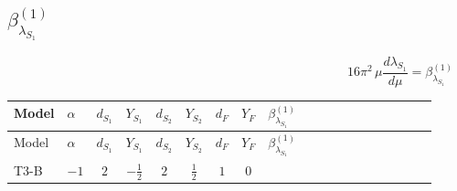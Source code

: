\documentclass{article}
\begin{document}
\begin{landscape}
\section*{$\beta_{\lambda_{S_1}}^{(1)}$}
\[16\pi^2\,\mu\frac{d \lambda_{S_1}}{d\mu}=\beta_{\lambda_{S_1}}^{(1)}\]
\tiny
\begin{longtable}{@{}llcccccc >{\raggedright\arraybackslash}p{0.54\linewidth}@{}}
\toprule
Model & $\alpha$ & $d_{S_1}$ & $Y_{S_1}$ & $d_{S_2}$ & $Y_{S_2}$ & $d_F$ & $Y_F$ & $\beta_{\lambda_{S_1}}^{(1)}$ \\
\midrule
\endfirsthead
\toprule
Model & $\alpha$ & $d_{S_1}$ & $Y_{S_1}$ & $d_{S_2}$ & $Y_{S_2}$ & $d_F$ & $Y_F$ & $\beta_{\lambda_{S_1}}^{(1)}$ \\
\midrule
\endhead
T3-B & $-1$ & $2$ & $-\frac{1}{2}$ & $2$ & $\frac{1}{2}$ & $1$ & $0$ & \scriptsize\adjustbox{max width=\linewidth}{$\begin{gathered} 4 {\lambda_{S_1}} \operatorname{Tr}\!\left({y_1}\,\left({y_1}\right)^{\dagger}\right) \\ +{\lambda_{S_1 S_1^{\dagger 2}S_2^\dagger}} (2 \operatorname{Tr}\!\left({y_1}\,\left({y_2}\right)^{\dagger}\right)+24 \left({\lambda_{S_1 S_1^{\dagger 2}S_2^\dagger}}\right)^{*}) \\ +2 \left({\lambda_{S_1 S_1^{\dagger 2}S_2^\dagger}}\right)^{*} \operatorname{Tr}\!\left({y_2}\,\left({y_1}\right)^{\dagger}\right) \\ -4 \operatorname{Tr}\!\left({y_1}\,\left({y_1}\right)^{\dagger}\,{y_1}\,\left({y_1}\right)^{\dagger}\right) \\ +8 {\lambda_{H^\dagger H^\dagger S_1^\dagger S_1^\dagger}} \left({\lambda_{H^\dagger H^\dagger S_1^\dagger S_1^\dagger}}\right)^{*} \\ +8 {\lambda_{S_1^{\dagger 2}S_2^{\dagger 2}}} \left({\lambda_{S_1^{\dagger 2}S_2^{\dagger 2}}}\right)^{*} \\ +\frac{9 {g_2}^4}{4} \\ +{g_Y}^2 \left(\frac{3 {g_2}^2}{2}-3 {\lambda_{S_1}}\right) \\ -9 {g_2}^2 {\lambda_{S_1}} \\ +\frac{3 {g_Y}^4}{4} \\ +4 {\lambda_{12}}^2 \\ +\frac{{\lambda_{12}^{\rm Adj}}^2}{4} \\ +4 {\lambda_{H1}}^2 \\ +\frac{{\lambda_{H1}^{\rm Adj}}^2}{4} \\ +12 {\lambda_{S_1}}^2\end{gathered}$} \\

\end{longtable}
\end{landscape}
\end{document}
